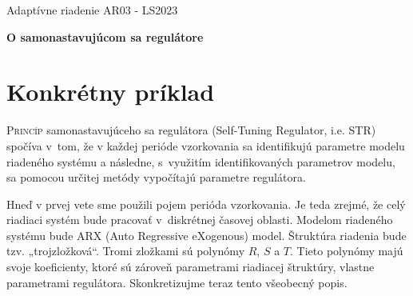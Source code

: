 \documentclass[a4paper, 10pt, ]{article}
\def\oznacenieCasti{AR03 - LS2023}
\begin{document}
\lstset{%
style=mystyle,
rangebeginprefix=\#\#\#\ cellB\ ,%
rangebeginsuffix=\ \#\#\#,%
rangeendprefix=\#\#\#\ cellE\ ,%
rangeendsuffix=\ \#\#\#,%
includerangemarker=false,
}






\fontsize{12pt}{22pt}\selectfont

\centerline{\textsf{Adaptívne riadenie} \hfill \textsf{\oznacenieCasti}}

\fontsize{18pt}{22pt}\selectfont





\begin{flushleft}
	\textbf{\textsf{O samonastavujúcom sa regulátore}}
\end{flushleft}





\normalsize

\bigskip

{\hypersetup{hidelinks}

\tableofcontents

}

\bigskip

\vspace{18pt}












\section{Konkrétny príklad}
\label{konkretPriklad}


\lettrine[lines=3, nindent=0pt]{P}{rincíp} samonastavujúceho sa regulátora (Self-Tuning Regulator, i.e. STR) spočíva v~tom, že v každej perióde vzorkovania sa identifikujú parametre modelu riadeného systému a následne, s~využitím identifikovaných parametrov modelu, sa pomocou určitej metódy vypočítajú parametre regulátora.

Hneď v prvej vete sme použili pojem perióda vzorkovania. Je teda zrejmé, že celý riadiaci systém bude pracovať v~diskrétnej časovej oblasti. Modelom riadeného systému bude ARX (Auto Regressive eXogenous) model. Štruktúra riadenia bude tzv.  „trojzložková“. Tromi zložkami sú polynómy $R$, $S$ a $T$. Tieto polynómy majú svoje koeficienty, ktoré sú zároveň parametrami riadiacej štruktúry, vlastne parametrami regulátora.
Skonkretizujme teraz tento všeobecný popis.
\end{document}
